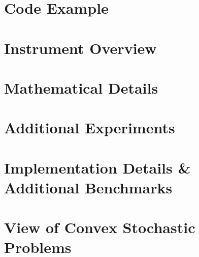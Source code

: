 \section{Code Example}\label{cockpit::app:code_example}


\section{Instrument Overview}\label{cockpit::app:cockpit_features}


\section{Mathematical Details}\label{cockpit::app:instruments}












\section{Additional Experiments}\label{cockpit::app:experiments}



\section{Implementation Details \& Additional
  Benchmarks}\label{cockpit::app:benchmarks}




\clearpage

\section{\cockpittitle View of Convex Stochastic Problems}\label{cockpit::app:convex-problems}


